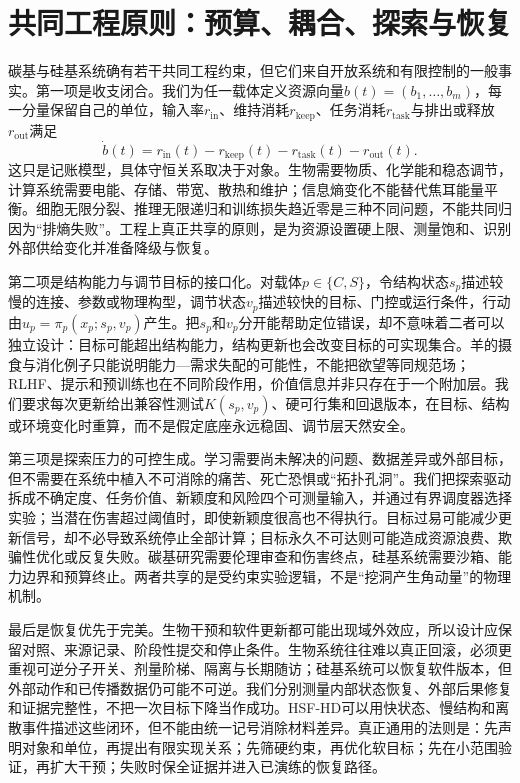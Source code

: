 \section{共同工程原则：预算、耦合、探索与恢复}
\label{sec:dual_track_engineering}

碳基与硅基系统确有若干共同工程约束，但它们来自开放系统和有限控制的一般事实。第一项是收支闭合。我们为任一载体定义资源向量$b(t)=(b_1,\ldots,b_m)$，每一分量保留自己的单位，输入率$r_{\mathrm{in}}$、维持消耗$r_{\mathrm{keep}}$、任务消耗$r_{\mathrm{task}}$与排出或释放$r_{\mathrm{out}}$满足
\begin{equation}
 \dot b(t)=r_{\mathrm{in}}(t)-r_{\mathrm{keep}}(t)-r_{\mathrm{task}}(t)-r_{\mathrm{out}}(t).
\end{equation}
这只是记账模型，具体守恒关系取决于对象。生物需要物质、化学能和稳态调节，计算系统需要电能、存储、带宽、散热和维护；信息熵变化不能替代焦耳能量平衡。细胞无限分裂、推理无限递归和训练损失趋近零是三种不同问题，不能共同归因为“排熵失败”。工程上真正共享的原则，是为资源设置硬上限、测量饱和、识别外部供给变化并准备降级与恢复。

第二项是结构能力与调节目标的接口化。对载体$p\in\{C,S\}$，令结构状态$s_p$描述较慢的连接、参数或物理构型，调节状态$v_p$描述较快的目标、门控或运行条件，行动由$u_p=\pi_p(x_p;s_p,v_p)$产生。把$s_p$和$v_p$分开能帮助定位错误，却不意味着二者可以独立设计：目标可能超出结构能力，结构更新也会改变目标的可实现集合。羊的摄食与消化例子只能说明能力—需求失配的可能性，不能把欲望等同规范场；RLHF、提示和预训练也在不同阶段作用，价值信息并非只存在于一个附加层。我们要求每次更新给出兼容性测试$K(s_p,v_p)$、硬可行集和回退版本，在目标、结构或环境变化时重算，而不是假定底座永远稳固、调节层天然安全。

第三项是探索压力的可控生成。学习需要尚未解决的问题、数据差异或外部目标，但不需要在系统中植入不可消除的痛苦、死亡恐惧或“拓扑孔洞”。我们把探索驱动拆成不确定度、任务价值、新颖度和风险四个可测量输入，并通过有界调度器选择实验；当潜在伤害超过阈值时，即使新颖度很高也不得执行。目标过易可能减少更新信号，却不必导致系统停止全部计算；目标永久不可达则可能造成资源浪费、欺骗性优化或反复失败。碳基研究需要伦理审查和伤害终点，硅基系统需要沙箱、能力边界和预算终止。两者共享的是受约束实验逻辑，不是“挖洞产生角动量”的物理机制。

最后是恢复优先于完美。生物干预和软件更新都可能出现域外效应，所以设计应保留对照、来源记录、阶段性提交和停止条件。生物系统往往难以真正回滚，必须更重视可逆分子开关、剂量阶梯、隔离与长期随访；硅基系统可以恢复软件版本，但外部动作和已传播数据仍可能不可逆。我们分别测量内部状态恢复、外部后果修复和证据完整性，不把一次目标下降当作成功。HSF-HD可以用快状态、慢结构和离散事件描述这些闭环，但不能由统一记号消除材料差异。真正通用的法则是：先声明对象和单位，再提出有限实现关系；先筛硬约束，再优化软目标；先在小范围验证，再扩大干预；失败时保全证据并进入已演练的恢复路径。

